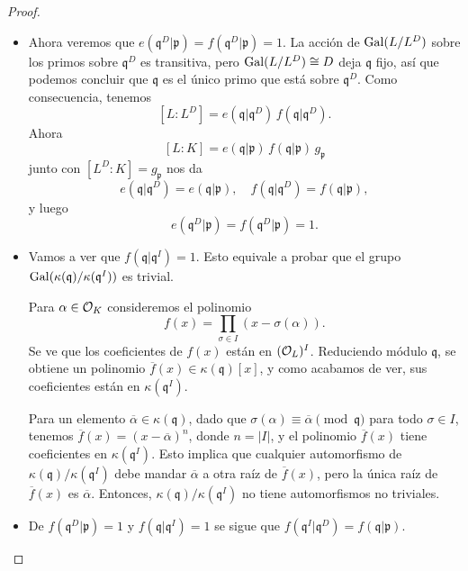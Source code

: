 \begin{teorema}
\begin{proof}
\begin{itemize}
      \item Ahora veremos que
        $e (\mathfrak{q}^D|\mathfrak{p}) = f (\mathfrak{q}^D|\mathfrak{p}) = 1$.
        La acción de $\operatorname{Gal} (L/L^D)$ sobre los primos sobre $\mathfrak{q}^D$ es
        transitiva, pero $\operatorname{Gal} (L/L^D) \cong D$ deja $\mathfrak{q}$ fijo, así que
        podemos concluir que $\mathfrak{q}$ es el único primo que está sobre
        $\mathfrak{q}^D$. Como consecuencia, tenemos
        $$[L : L^D] = e (\mathfrak{q}|\mathfrak{q}^D) \, f (\mathfrak{q}|\mathfrak{q}^D).$$
        Ahora
        $$[L : K] = e (\mathfrak{q}|\mathfrak{p}) \, f (\mathfrak{q}|\mathfrak{p}) \, g_\mathfrak{p}$$
        junto con $[L^D : K] = g_\mathfrak{p}$ nos da
        \[ e (\mathfrak{q}|\mathfrak{q}^D) = e (\mathfrak{q}|\mathfrak{p}), \quad
           f (\mathfrak{q}|\mathfrak{q}^D) = f (\mathfrak{q}|\mathfrak{p}), \]
        y luego
        $$e (\mathfrak{q}^D|\mathfrak{p}) = f (\mathfrak{q}^D|\mathfrak{p}) = 1.$$

      \item Vamos a ver que $f (\mathfrak{q}|\mathfrak{q}^I) = 1$. Esto
        equivale a probar que el grupo
        $\operatorname{Gal} (\kappa (\mathfrak{q})/\kappa (\mathfrak{q}^I))$ es trivial.

        Para $\alpha \in \mathcal{O}_K$ consideremos el polinomio
        $$f (x) = \prod_{\sigma \in I} (x - \sigma (\alpha)).$$
        Se ve que los coeficientes de $f (x)$ están en $(\mathcal{O}_L)^I$. Reduciendo módulo
        $\mathfrak{q}$, se obtiene un polinomio
        $\overline{f} (x) \in \kappa (\mathfrak{q}) [x]$, y como acabamos de ver, sus
        coeficientes están en $\kappa (\mathfrak{q}^I)$.

        Para un elemento $\overline{\alpha} \in \kappa (\mathfrak{q})$, dado que
        $\sigma (\alpha) \equiv \overline{\alpha} \pmod{\mathfrak{q}}$ para todo
        $\sigma \in I$, tenemos $\overline{f} (x) = (x - \overline{\alpha})^n$,
        donde $n = |I|$, y el polinomio $\overline{f} (x)$ tiene coeficientes en
        $\kappa (\mathfrak{q}^I)$. Esto implica que cualquier automorfismo de
        $\kappa (\mathfrak{q})/\kappa (\mathfrak{q}^I)$ debe mandar
        $\overline{\alpha}$ a otra raíz de $\overline{f} (x)$, pero la única
        raíz de $\overline{f} (x)$ es $\overline{\alpha}$. Entonces, $\kappa
        (\mathfrak{q})/\kappa (\mathfrak{q}^I)$ no tiene automorfismos no
        triviales.

      \item De $f (\mathfrak{q}^D|\mathfrak{p}) = 1$ y
        $f (\mathfrak{q}|\mathfrak{q}^I) = 1$ se sigue que
        $f (\mathfrak{q}^I|\mathfrak{q}^D) = f (\mathfrak{q}|\mathfrak{p})$.


\end{itemize}
\end{proof}
\end{teorema}
